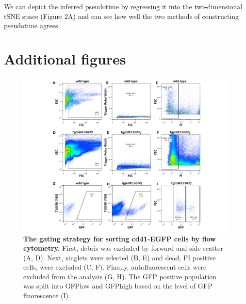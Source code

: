 We can depict the inferred pseudotime by regressing it into the two-dimensional tSNE space (Figure 2A) and can see how well the two methods of constructing pseudotime agrees.

\section{Additional figures}

\begin{figure}
    \centering
    \includegraphics[width=\textwidth]{"SF1"}
    \caption[The gating strategy for sorting cd41-EGFP cells by flow cytometry]{\textbf{The gating strategy for sorting cd41-EGFP cells by flow cytometry.} First, debris was excluded by forward and side-scatter (A, D). Next, singlets were selected (B, E) and dead, PI positive cells, were excluded (C, F). Finally, autofluorescent cells were excluded from the analysis (G, H). The GFP positive population was split into GFPlow and GFPhigh based on the level of GFP fluorescence (I).}
    \label{fig:gating}
\end{figure}

